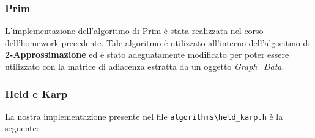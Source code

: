 \documentclass[]{article}
\begin{document}
\subsubsection{Prim}
L'implementazione dell'algoritmo di Prim è stata realizzata nel corso dell'homework precedente. Tale algoritmo è utilizzato all'interno dell'algoritmo di \textbf{2-Approssimazione} ed è stato adeguatamente modificato per poter essere utilizzato con la matrice di adiacenza estratta da un oggetto \textit{Graph\_Data}.
\subsubsection{Held e Karp}
\begin{flushleft}
La nostra implementazione presente nel file \verb|algorithms\held_karp.h| è la seguente:
\lstset{language=c++, style=mystyle}



\end{flushleft}
\end{document}
